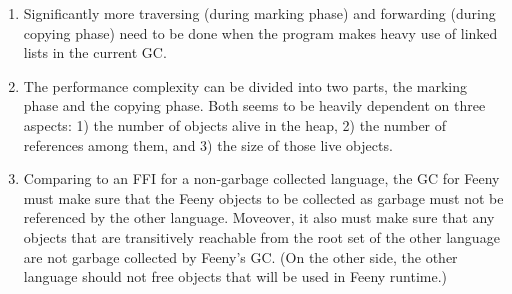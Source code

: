 \documentclass[notitlepage]{report}
\begin{document}
\begin{enumerate}
	\item 
		Significantly more traversing (during marking phase) and forwarding (during copying phase) need to be done when the program makes heavy use of linked lists in the current GC.
	\item 
		The performance complexity can be divided into two parts, the marking phase and the copying phase. Both seems to be heavily dependent on three aspects: 1) the number of objects alive in the heap, 2) the number of references among them, and 3) the size of those live objects.
	\item 
		Comparing to an FFI for a non-garbage collected language, the GC for Feeny must make sure that the Feeny objects to be collected as garbage must not be referenced by the other language. Moveover, it also must make sure that any objects that are transitively reachable from the root set of the other language are not garbage collected by Feeny's GC. (On the other side, the other language should not free objects that will be used in Feeny runtime.)
\end{enumerate}
\end{document}
